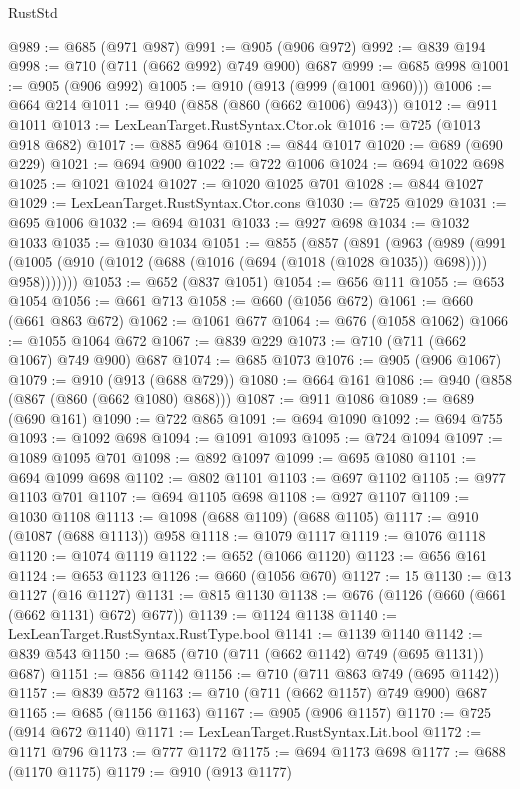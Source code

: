\begin{lexlean}{RustStd}
\begin{coremodule}
@989 := @685 (@971 @987)
@991 := @905 (@906 @972)
@992 := @839 @194
@998 := @710 (@711 (@662 @992) @749 @900) @687
@999 := @685 @998
@1001 := @905 (@906 @992)
@1005 := @910 (@913 (@999 (@1001 @960)))
@1006 := @664 @214
@1011 := @940 (@858 (@860 (@662 @1006) @943))
@1012 := @911 @1011
@1013 := LexLeanTarget.RustSyntax.Ctor.ok
@1016 := @725 (@1013 @918 @682)
@1017 := @885 @964
@1018 := @844 @1017
@1020 := @689 (@690 @229)
@1021 := @694 @900
@1022 := @722 @1006
@1024 := @694 @1022 @698
@1025 := @1021 @1024
@1027 := @1020 @1025 @701
@1028 := @844 @1027
@1029 := LexLeanTarget.RustSyntax.Ctor.cons
@1030 := @725 @1029
@1031 := @695 @1006
@1032 := @694 @1031
@1033 := @927 @698
@1034 := @1032 @1033
@1035 := @1030 @1034
@1051 := @855
    (@857
      (@891
        (@963
          (@989
            (@991 (@1005 (@910 (@1012 (@688 (@1016 (@694 (@1018 (@1028 @1035)) @698)))) @958)))))))
@1053 := @652 (@837 @1051)
@1054 := @656 @111
@1055 := @653 @1054
@1056 := @661 @713
@1058 := @660 (@1056 @672)
@1061 := @660 (@661 @863 @672)
@1062 := @1061 @677
@1064 := @676 (@1058 @1062)
@1066 := @1055 @1064 @672
@1067 := @839 @229
@1073 := @710 (@711 (@662 @1067) @749 @900) @687
@1074 := @685 @1073
@1076 := @905 (@906 @1067)
@1079 := @910 (@913 (@688 @729))
@1080 := @664 @161
@1086 := @940 (@858 (@867 (@860 (@662 @1080) @868)))
@1087 := @911 @1086
@1089 := @689 (@690 @161)
@1090 := @722 @865
@1091 := @694 @1090
@1092 := @694 @755
@1093 := @1092 @698
@1094 := @1091 @1093
@1095 := @724 @1094
@1097 := @1089 @1095 @701
@1098 := @892 @1097
@1099 := @695 @1080
@1101 := @694 @1099 @698
@1102 := @802 @1101
@1103 := @697 @1102
@1105 := @977 @1103 @701
@1107 := @694 @1105 @698
@1108 := @927 @1107
@1109 := @1030 @1108
@1113 := @1098 (@688 @1109) (@688 @1105)
@1117 := @910 (@1087 (@688 @1113)) @958
@1118 := @1079 @1117
@1119 := @1076 @1118
@1120 := @1074 @1119
@1122 := @652 (@1066 @1120)
@1123 := @656 @161
@1124 := @653 @1123
@1126 := @660 (@1056 @670)
@1127 := 15
@1130 := @13 @1127 (@16 @1127)
@1131 := @815 @1130
@1138 := @676 (@1126 (@660 (@661 (@662 @1131) @672) @677))
@1139 := @1124 @1138
@1140 := LexLeanTarget.RustSyntax.RustType.bool
@1141 := @1139 @1140
@1142 := @839 @543
@1150 := @685 (@710 (@711 (@662 @1142) @749 (@695 @1131)) @687)
@1151 := @856 @1142
@1156 := @710 (@711 @863 @749 (@695 @1142))
@1157 := @839 @572
@1163 := @710 (@711 (@662 @1157) @749 @900) @687
@1165 := @685 (@1156 @1163)
@1167 := @905 (@906 @1157)
@1170 := @725 (@914 @672 @1140)
@1171 := LexLeanTarget.RustSyntax.Lit.bool
@1172 := @1171 @796
@1173 := @777 @1172
@1175 := @694 @1173 @698
@1177 := @688 (@1170 @1175)
@1179 := @910 (@913 @1177)

\end{coremodule}
\end{lexlean}
